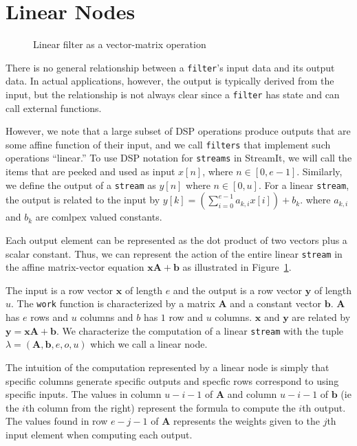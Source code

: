 \section{Linear Nodes}
\begin{figure}
\center
\epsfxsize=3.0in
\caption{Linear filter as a vector-matrix operation}
\label{fig:overview-matrix}
\vspace{-12pt}
\end{figure}

There is no general relationship between a {\tt filter}'s input data and
its output data. In actual applications, however, the output is typically 
derived from the input, but the relationship is not always clear 
since a {\tt filter} has state and can call external functions.

However, we note that a large subset of DSP operations produce outputs
that are some affine function of their input, and we call {\tt filters} that 
implement such operations ``linear.'' To use DSP notation for {\tt streams} in
StreamIt, we will call the items that are peeked and used as input
$x[n]$, where  $n\in[0,e-1]$. Similarly, we define the output of 
a {\tt stream} as $y[n]$ where  $n\in[0,u]$. For a linear {\tt stream}, 
the output is related to the input by $y[k] = (\sum_{i=0}^{e-1} a_{k,i}x[i])+b_k$.
where $a_{k,i}$ and $b_{k}$ are comlpex valued constants. 

Each output element can be represented as the dot product of two vectors 
plus a scalar constant.  Thus, we can represent the action of the 
entire linear {\tt stream} in the affine matrix-vector equation ${\mathbf x} {\mathbf A} + {\mathbf b}$ 
as illustrated in Figure~\ref{fig:overview-matrix}.

The input is a row vector ${\mathbf x}$ of length $e$
and the output is a row vector ${\mathbf y}$ of length $u$. The {\tt work} function
is characterized by a matrix ${\mathbf A}$ and a constant vector ${\mathbf b}$. 
${\mathbf A}$ has $e$ rows and $u$ columns and $b$ has $1$ row and $u$ columns. 
${\mathbf x}$ and ${\mathbf y}$ are related by ${\mathbf y} = {\mathbf x}{\mathbf A} + {\mathbf b}$. 
We characterize the computation of a linear {\tt stream} with the tuple 
$\lambda = ({\mathbf A},{\mathbf b},e,o,u)$ which we call a linear node.

The intuition of the computation represented by a linear node is simply
that specific columns generate specific outputs and specfic rows 
correspond to using specific inputs.
The values in column $u-i-1$ of ${\mathbf A}$ and column $u-i-1$ of ${\mathbf b}$ 
(ie the $i$th column from the right) represent the formula to compute the $i$th output.
The values found in row $e-j-1$ of ${\mathbf A}$ represents the weights given to the $j$th 
input element when computing each output.




